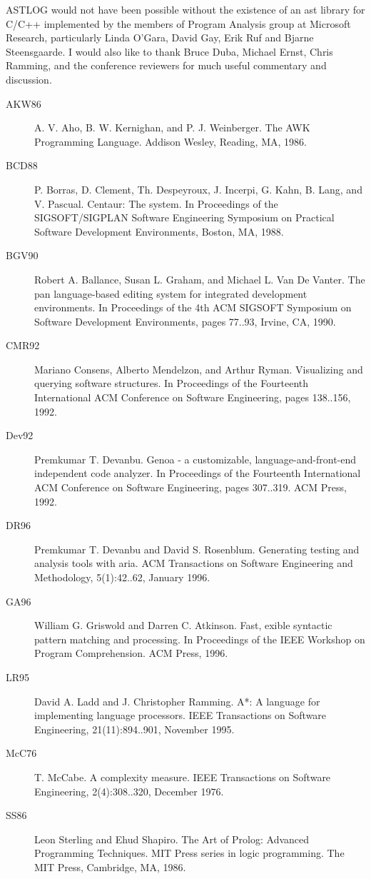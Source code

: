 
ASTLOG would not have been possible without the existence
of an ast library for C/C++ implemented by
the members of Program Analysis group at Microsoft
Research, particularly Linda O'Gara, David Gay, Erik
Ruf and Bjarne Steensgaarde. I would also like to
thank Bruce Duba, Michael Ernst, Chris Ramming,
and the conference reviewers for much useful commentary
and discussion.


\begin{description}
\item[AKW86] A. V. Aho, B. W. Kernighan, and P. J.
Weinberger. The AWK Programming Language.
Addison Wesley, Reading, MA,
1986.
\item[BCD88] P. Borras, D. Clement, Th. Despeyroux,
J. Incerpi, G. Kahn, B. Lang, and V. Pascual.
Centaur: The system. In Proceedings
of the SIGSOFT/SIGPLAN Software
Engineering Symposium on Practical Software
Development Environments, Boston,
MA, 1988.
\item[BGV90] Robert A. Ballance, Susan L. Graham,
and Michael L. Van De Vanter. The
pan language-based editing system for integrated
development environments. In Proceedings
of the 4th ACM SIGSOFT Symposium
on Software Development Environments,
pages 77..93, Irvine, CA, 1990.
\item[CMR92] Mariano Consens, Alberto Mendelzon, and
Arthur Ryman. Visualizing and querying
software structures. In Proceedings of the
Fourteenth International ACM Conference
on Software Engineering, pages 138..156,
1992.
\item[Dev92] Premkumar T. Devanbu. Genoa - a
customizable, language-and-front-end independent
code analyzer. In Proceedings of
the Fourteenth International ACM Conference
on Software Engineering, pages 307..319. ACM Press, 1992.
\item[DR96] Premkumar T. Devanbu and David S.
Rosenblum. Generating testing and analysis
tools with aria. ACM Transactions
on Software Engineering and Methodology, 5(1):42..62, January 1996.
\item[GA96] William G. Griswold and Darren C. Atkinson.
Fast, exible syntactic pattern matching
and processing. In Proceedings of the
IEEE Workshop on Program Comprehension.
ACM Press, 1996.
\item[LR95] David A. Ladd and J. Christopher Ramming.
A*: A language for implementing
language processors. IEEE Transactions
on Software Engineering, 21(11):894..901,
November 1995.
\item[McC76] T. McCabe. A complexity measure.
IEEE Transactions on Software Engineering,
2(4):308..320, December 1976.
\item[SS86] Leon Sterling and Ehud Shapiro. The Art
of Prolog: Advanced Programming Techniques.
MIT Press series in logic programming.
The MIT Press, Cambridge, MA,
1986.
\end{description}

